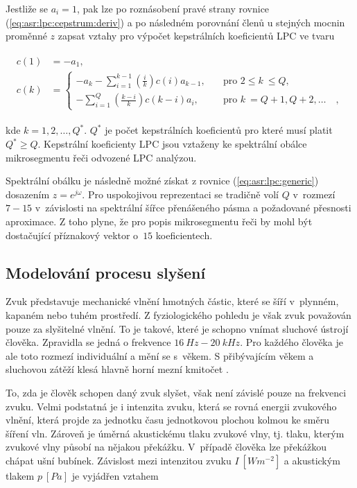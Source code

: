 \noindent Jestliže se $a_i = 1$, pak lze po roznásobení pravé strany rovnice (\ref{eq:asr:lpc:cepstrum:deriv}) a po následném porovnání členů u stejných mocnin proměnné $z$ zapsat vztahy pro výpočet kepstrálních koeficientů LPC ve tvaru

\begin{align}
  \begin{split}
    c(1) &= -a_1, \\
    c(k) &=
    \begin{cases}
      - a_k - \sum_{i=1}^{k-1} \left(\frac{i}{k}\right) c(i) a_{k-1},  & \quad \text{pro } 2 \leq  k~\leq Q, \\
      - \sum_{i=1}^{Q} \left(\frac{k - i}{k}\right) c(k-i) a_i,  & \quad \text{pro }  k~= Q + 1, Q + 2, \dots \quad ,
    \end{cases}
  \end{split}
  \label{eq:asr:lpc:cepstrum:coef}
\end{align}

\noindent kde $k = 1, 2, \dots , Q^{*}$. $Q^{*}$ je počet kepstrálních koeficientů pro které musí platit $Q^{*} \geq Q$. Kepstrální koeficienty LPC jsou vztaženy ke spektrální obálce mikrosegmentu řeči odvozené LPC analýzou.

Spektrální obálku je následně možné získat z rovnice (\ref{eq:asr:lpc:generic}) dosazením $z = e^{j\omega}$. Pro uspokojivou reprezentaci se tradičně volí $Q$ v~rozmezí $7-15$ v~závislosti na spektrální šířce přenášeného pásma a požadované přesnosti aproximace. Z toho plyne, že pro popis mikrosegmentu řeči by mohl být dostačující příznakový vektor o~$15$ koeficientech.

\subsection{Modelování procesu slyšení}
\label{chap:asr:parametrization:hearing}

Zvuk představuje mechanické vlnění hmotných částic, které se šíří v~plynném, kapaném nebo tuhém prostředí. Z fyziologického pohledu je však zvuk považován pouze za slyšitelné vlnění. To je takové, které je schopno vnímat sluchové ústrojí člověka. Zpravidla se jedná o frekvence $16\ Hz - 20\ kHz$. Pro každého člověka je ale toto rozmezí individuální a mění se s~věkem. S přibývajícím věkem a sluchovou zátěží klesá hlavně horní mezní kmitočet \cite{Psutka2006}.

To, zda je člověk schopen daný zvuk slyšet, však není závislé pouze na frekvenci zvuku. Velmi podstatná je i intenzita zvuku, která se rovná energii zvukového vlnění, která projde za jednotku času jednotkovou plochou kolmou ke směru šíření vln. Zároveň je úměrná akustickému tlaku zvukové vlny, tj. tlaku, kterým zvukové vlny působí na nějakou překážku. V~případě člověka lze překážkou chápat ušní bubínek. Závislost mezi intenzitou zvuku $I\ \left[Wm^{-2}\right]$ a akustickým tlakem $p\ \left[Pa\right]$ je vyjádřen vztahem

